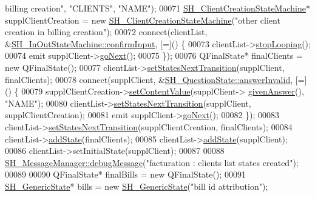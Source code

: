 \begin{DoxyCode}
{       billing creation"}, \textcolor{stringliteral}{"CLIENTS"}, \textcolor{stringliteral}{"NAME"});
00071     \hyperlink{classSH__ClientCreationStateMachine}{SH\_ClientCreationStateMachine}* supplClientCreation = \textcolor{keyword}{new} 
      \hyperlink{classSH__ClientCreationStateMachine}{SH\_ClientCreationStateMachine}(\textcolor{stringliteral}{"other client creation in billing creation"});
00072     connect(clientList, &\hyperlink{classSH__InOutStateMachine_a7f7d9c9300c1d05bce2c26029f28cc31}{SH\_InOutStateMachine::confirmInput}, [=]() \{
00073         clientList->\hyperlink{classSH__LoopingInOutStateMachine_a73d75e30318da22fec99387e9bf02a9b}{stopLooping}();
00074         emit supplClient->\hyperlink{classSH__GenericState_a34c1bebc765cc3a62d66c94c37d4f0c3}{goNext}();
00075     \});
00076     QFinalState* finalClients = \textcolor{keyword}{new} QFinalState();
00077     clientList->\hyperlink{classSH__LoopingInOutStateMachine_a0ee122553641721012f3710e71cce234}{setStatesNextTransition}(supplClient, finalClients);
00078     connect(supplClient, &\hyperlink{classSH__QuestionState_a3348a8a683130678ac87a10ba2a25486}{SH\_QuestionState::answerInvalid}, [=]() \{
00079         supplClientCreation->\hyperlink{classSH__InOutStateMachine_a9ab1534306b2bdb62743d4bcefe40c17}{setContentValue}(supplClient->
      \hyperlink{classSH__QuestionState_a29cdea8bc55e39e3ed02d24743c30f8c}{givenAnswer}(), \textcolor{stringliteral}{"NAME"});
00080         clientList->\hyperlink{classSH__LoopingInOutStateMachine_a0ee122553641721012f3710e71cce234}{setStatesNextTransition}(supplClient, supplClientCreation);
00081         emit supplClient->\hyperlink{classSH__GenericState_a34c1bebc765cc3a62d66c94c37d4f0c3}{goNext}();
00082     \});
00083     clientList->\hyperlink{classSH__LoopingInOutStateMachine_a0ee122553641721012f3710e71cce234}{setStatesNextTransition}(supplClientCreation, finalClients);
00084     clientList->\hyperlink{classSH__InOutStateMachine_a3de9dedcdfd6efab868484c047638f71}{addState}(finalClients);
00085     clientList->\hyperlink{classSH__InOutStateMachine_a3de9dedcdfd6efab868484c047638f71}{addState}(supplClient);
00086     clientList->setInitialState(supplClient);
00087 
00088     \hyperlink{classSH__MessageManager_a379f2aa0a590a5add34dbe91f98b2ff7}{SH\_MessageManager::debugMessage}(\textcolor{stringliteral}{"facturation : clients list states
       created"});
00089 
00090     QFinalState* finalBills = \textcolor{keyword}{new} QFinalState();
00091     \hyperlink{classSH__GenericState}{SH\_GenericState}* bills = \textcolor{keyword}{new} \hyperlink{classSH__GenericState}{SH\_GenericState}(\textcolor{stringliteral}{"bill id attribution"});

\end{DoxyCode}
